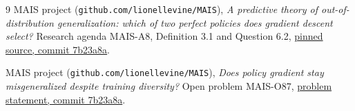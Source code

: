 \documentclass[11pt]{article}
\begin{document}
\begin{thebibliography}{9}
MAIS project (\texttt{github.com/lionellevine/MAIS}),
\emph{A predictive theory of out-of-distribution generalization:
which of two perfect policies does gradient descent select?}
Research agenda MAIS-A8, Definition 3.1 and Question 6.2,
\href{https://github.com/lionellevine/MAIS/blob/7b23a8a30c0eb0b1d3b55c592ca9554256fc4805/agendas/A8/MAIS-A8.tex}{pinned source, commit 7b23a8a}.

MAIS project (\texttt{github.com/lionellevine/MAIS}),
\emph{Does policy gradient stay misgeneralized despite training diversity?}
Open problem MAIS-O87,
\href{https://github.com/lionellevine/MAIS/blob/7b23a8a30c0eb0b1d3b55c592ca9554256fc4805/open-problems/MAIS-O87.md}{problem statement, commit 7b23a8a}.
\end{thebibliography}
\end{document}
